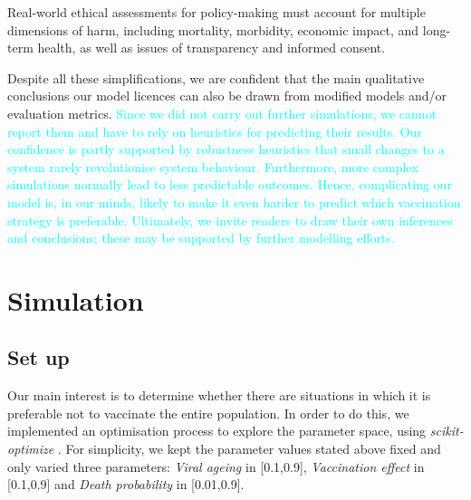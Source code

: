 \documentclass[a4paper,12pt]{article}
\newcommand{\juergen}[1]{\textcolor{cyan}{#1}}
\begin{document}

Real-world ethical assessments for policy-making must account for multiple dimensions of harm, including mortality, morbidity, economic impact, and long-term health, as well as issues of transparency and informed consent.

Despite all these simplifications, we are confident that the main qualitative conclusions our model licences can also be drawn from modified models and/or evaluation metrics. \juergen{Since we did not carry out further simulations, we cannot report them and have to rely on heuristics for predicting their results. Our confidence is partly supported by robustness heuristics that small changes to a system rarely revolutionise system behaviour. Furthermore, more complex simulations normally lead to less predictable outcomes. Hence, complicating our model is, in our minds, likely to make it even harder to predict which vaccination strategy is preferable. Ultimately, we invite readers to draw their own inferences and conclusions; these may be supported by further modelling efforts.}


\section{Simulation}\label{sec:Results}
\subsection{Set up}
Our main interest is to determine whether there are situations in which it is preferable not to vaccinate the entire population. In order to do this, we implemented an optimisation process to explore the parameter space, using \textit{scikit-optimize} \cite{head_scikit_optimize_2021}. For simplicity, we kept the parameter values stated above fixed and only varied three parameters: \emph{Viral ageing} in [0.1,0.9], \emph{Vaccination effect} in [0.1,0.9] and \emph{Death probability} in [0.01,0.9]. 
\end{document}

